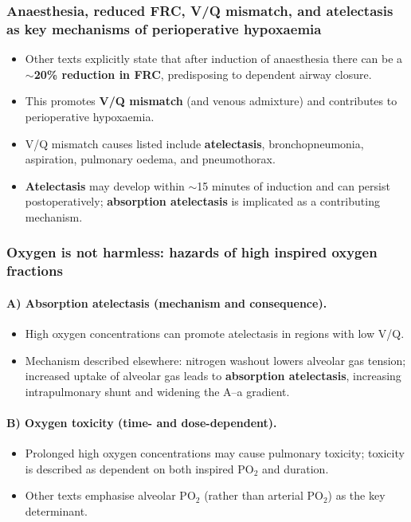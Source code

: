 \documentclass[11pt,a4paper]{article}
\begin{document}
\subsubsection{Anaesthesia, reduced FRC, V/Q mismatch, and atelectasis as key mechanisms of perioperative hypoxaemia}
\begin{itemize}
  \item Other texts explicitly state that after induction of anaesthesia there can be a \textbf{$\sim$20\% reduction in FRC}, predisposing to dependent airway closure.
  \item This promotes \textbf{V/Q mismatch} (and venous admixture) and contributes to perioperative hypoxaemia.
  \item V/Q mismatch causes listed include \textbf{atelectasis}, bronchopneumonia, aspiration, pulmonary oedema, and pneumothorax.
  \item \textbf{Atelectasis} may develop within $\sim$15 minutes of induction and can persist postoperatively; \textbf{absorption atelectasis} is implicated as a contributing mechanism.
\end{itemize}

\subsubsection{Oxygen is not harmless: hazards of high inspired oxygen fractions}

\paragraph{A) Absorption atelectasis (mechanism and consequence).}
\begin{itemize}
  \item High oxygen concentrations can promote atelectasis in regions with low V/Q.
  \item Mechanism described elsewhere: nitrogen washout lowers alveolar gas tension; increased uptake of alveolar gas leads to \textbf{absorption atelectasis}, increasing intrapulmonary shunt and widening the A--a gradient.
\end{itemize}

\paragraph{B) Oxygen toxicity (time- and dose-dependent).}
\begin{itemize}
  \item Prolonged high oxygen concentrations may cause pulmonary toxicity; toxicity is described as dependent on both inspired PO$_2$ and duration.
  \item Other texts emphasise alveolar PO$_2$ (rather than arterial PO$_2$) as the key determinant.
\end{itemize}
\end{document}
